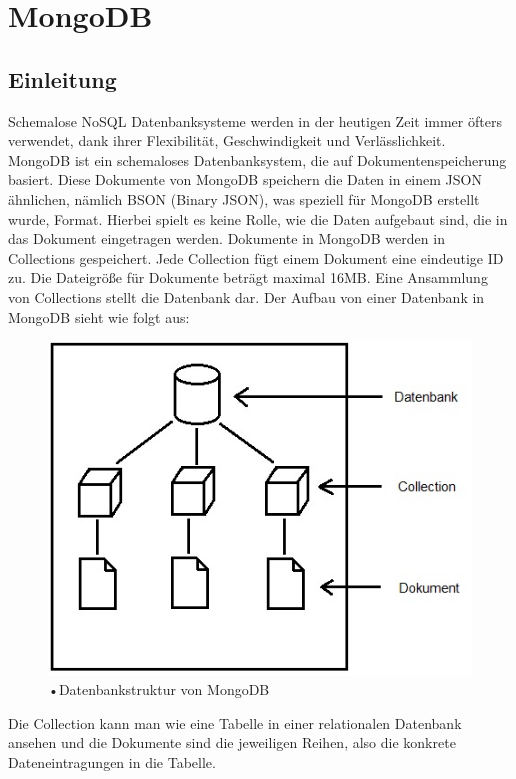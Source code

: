 \section{MongoDB}
\subsection{Einleitung}
Schemalose NoSQL Datenbanksysteme werden in der heutigen Zeit immer öfters verwendet, dank ihrer Flexibilität, Geschwindigkeit und Verlässlichkeit. MongoDB ist ein schemaloses Datenbanksystem, die auf Dokumentenspeicherung basiert. Diese Dokumente von MongoDB speichern die Daten in einem JSON ähnlichen, nämlich BSON (Binary JSON), was speziell für MongoDB erstellt wurde, Format. Hierbei spielt es keine Rolle, wie die Daten aufgebaut sind, die in das Dokument eingetragen werden. Dokumente in MongoDB werden in Collections gespeichert. Jede Collection fügt einem Dokument eine eindeutige ID zu.  Die Dateigröße für Dokumente beträgt maximal 16MB. Eine Ansammlung von Collections stellt die Datenbank dar.
Der Aufbau von einer Datenbank in MongoDB sieht wie folgt aus:
\begin{figure}
	\centering
	\includegraphics[scale=1]{images/Datenmodell_Mongo.jpg}  
	\caption{•Datenbankstruktur von MongoDB}
\end{figure}
Die Collection kann man wie eine Tabelle in einer relationalen Datenbank ansehen und die Dokumente sind die jeweiligen Reihen, also die konkrete Dateneintragungen in die Tabelle.
